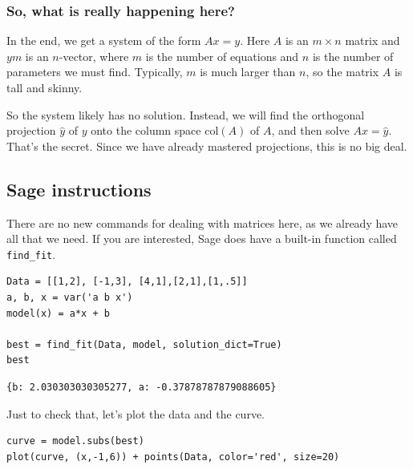 \documentclass[10pt,]{book}
\theoremstyle{plain}
\theoremstyle{definition}
\numberwithin{equation}{section}
\begin{document}
\subsubsection[So, what is really happening here?]{So, what is really happening here?}\label{subsubsection-46}

        In the end, we get a system of the form \(Ax = y\). Here \(A\) is
        an \(m\times n\) matrix and \(ym\) is an \(n\)-vector, where
        \(m\) is the number of equations and \(n\) is the number of
        parameters we must find.
        Typically, \(m\) is much larger than \(n\), so the matrix \(A\)
        is tall and skinny.
\par

        So the system likely has no solution. Instead, we will find the orthogonal
        projection \(\hat{y}\) of \(y\) onto the column space
        \(\mathrm{col}(A)\) of \(A\), and then solve \(Ax = \hat{y}\).
        That's the secret. Since we have already mastered projections, this is
        no big deal.
\typeout{************************************************}
\typeout{************************************************}
\subsection[Sage instructions]{Sage instructions}\label{subsection-106}

      There are no new commands for dealing with matrices here, as we already
      have all that we need. If you are interested, Sage does have a built-in
      function called \verb?find_fit?.
\begin{lstlisting}[style=sageinput]
Data = [[1,2], [-1,3], [4,1],[2,1],[1,.5]]
a, b, x = var('a b x')
model(x) = a*x + b

best = find_fit(Data, model, solution_dict=True)
best
\end{lstlisting}
\begin{lstlisting}[style=sageoutput]
{b: 2.030303030305277, a: -0.37878787879088605}
\end{lstlisting}
\par
Just to check that, let's plot the data and the curve.%
\begin{lstlisting}[style=sageinput]
curve = model.subs(best)
plot(curve, (x,-1,6)) + points(Data, color='red', size=20)
\end{lstlisting}
\par
\end{document}
